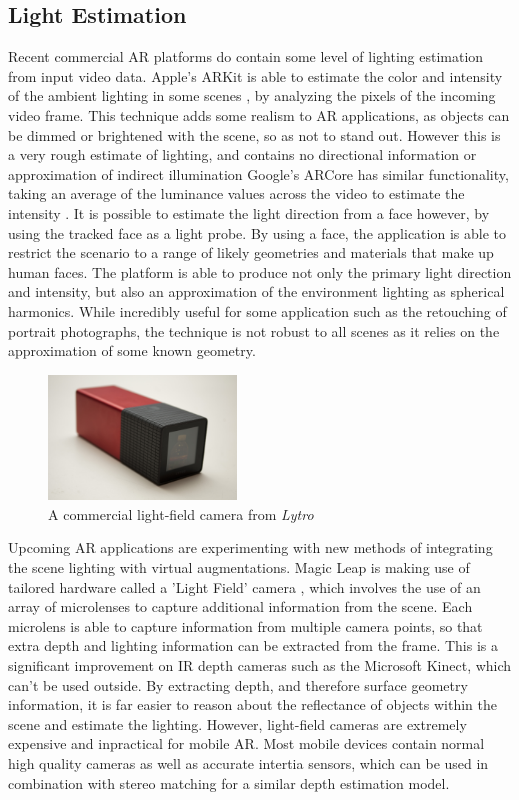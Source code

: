 \documentclass[ %
                    author={Gavin Parker},
                supervisor={Dr. Neill Campbell},
                    degree={MEng},
                     title={Deep Siamese Networks for Illumination Estimation from Stereo Images},
                  subtitle={},
                      type={Research},
                      year={2018} ]{dissertation}
\begin{document}
\subsection{Light Estimation}
Recent commercial AR platforms do contain some level of lighting estimation from input video data. Apple's ARKit is able to estimate the color and intensity of the ambient lighting in some scenes \cite{arkit1}, by analyzing the pixels of the incoming video frame. This technique adds some realism to AR applications, as objects can be dimmed or brightened with the scene, so as not to stand out. However this is a very rough estimate of lighting, and contains no directional information or approximation of indirect illumination  Google's ARCore has similar functionality, taking an average of the luminance values across the video to estimate the intensity \cite{Debevec:1998:RSO:280814.280864}. It is possible to estimate the light direction from a face \cite{DBLP:journals/corr/abs-1803-06340} however, by using the tracked face as a light probe. By using a face, the application is able to restrict the scenario to a range of likely geometries and materials that make up human faces. The platform is able to produce not only the primary light direction and intensity, but also an approximation of the environment lighting as spherical harmonics. While incredibly useful for some application such as the retouching of portrait photographs, the technique is not robust to all scenes as it relies on the approximation of some known geometry.
\begin{figure}
\includegraphics[width=5cm]{images/lytro}
\centering
\caption{A commercial light-field camera from \textit{Lytro}}
\end{figure}
\newline
Upcoming AR applications are experimenting with new methods of integrating the scene lighting with virtual augmentations. Magic Leap is making use of tailored hardware called a 'Light Field' camera \cite{ng2005light}, which involves the use of an array of microlenses to capture additional information from the scene. Each microlens is able to capture information from multiple camera points, so that extra depth and lighting information can be extracted from the frame. This is a significant improvement on IR depth cameras such as the Microsoft Kinect, which can't be used outside. By extracting depth, and therefore surface geometry information, it is far easier to reason about the reflectance of objects within the scene and estimate the lighting. However, light-field cameras are extremely expensive and inpractical for mobile AR. Most mobile devices contain normal high quality cameras as well as accurate intertia sensors, which can be used in combination with stereo matching for a similar depth estimation model.
\end{document}
